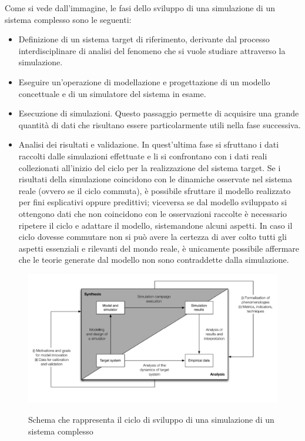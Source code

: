 \documentclass[11pt]{article}
\begin{document}
Come si vede dall'immagine, le fasi dello sviluppo di una simulazione di un sistema complesso sono le seguenti: 
\begin{itemize}
    \item Definizione di un sistema target di riferimento, derivante dal processo interdisciplinare di analisi del fenomeno che si vuole studiare attraverso la simulazione. 
    \item Eseguire un'operazione di modellazione e progettazione di un modello concettuale e di un simulatore del sistema in esame. 
    \item Esecuzione di simulazioni. Questo passaggio permette di acquisire una grande quantità di dati che risultano essere particolarmente utili nella fase successiva.
    \item Analisi dei risultati e validazione. In quest'ultima fase si sfruttano i dati raccolti dalle simulazioni effettuate e li si confrontano con i dati reali collezionati all'inizio del ciclo per la realizzazione del sistema target. Se i risultati della simulazione coincidono con le dinamiche osservate nel sistema reale (ovvero se il ciclo commuta), è possibile sfruttare il modello realizzato per fini esplicativi oppure predittivi; viceversa se dal modello sviluppato si ottengono dati che non coincidono con le osservazioni raccolte è necessario ripetere il ciclo e adattare il modello, sistemandone alcuni aspetti. In caso il ciclo dovesse commutare non si può avere la certezza di aver colto tutti gli aspetti essenziali e rilevanti del mondo reale, è unicamente possibile affermare che le teorie generate dal modello non sono contraddette dalla simulazione. 
\end{itemize}

\begin{figure}
    \centering
    \includegraphics[scale = 0.6]{cicloSviluppoSimulazione.png}
    \label{figCicloSviluppo}
    \caption{Schema che rappresenta il ciclo di sviluppo di una simulazione di un sistema complesso}
\end{figure}
\end{document}
